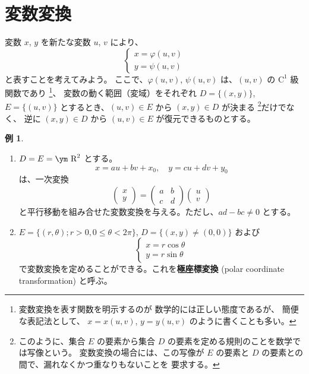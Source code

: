 \documentclass[a4paper]{jsarticle}
\theoremstyle{definition}
\newtheorem{Example}[Theorem]{例}
\theoremstyle{remark}
\newcommand{\R}{\text{\ym R}}
\begin{document}

\section{変数変換}
変数 $x$, $y$ を新たな変数 $u$, $v$ により、
\[
\left\{
\begin{matrix}
x = \varphi(u,v)\\
y = \psi(u,v)
\end{matrix}
\right.
\]
と表すことを考えてみよう。
ここで、$\varphi(u,v)$, $\psi(u,v)$ は、$(u,v)$ の $\text{C}^1$ 級関数であり
\footnote{変数変換を表す関数を明示するのが 数学的には正しい態度であるが、
簡便な表記法として、
$x=x(u,v)$, $y = y(u,v)$ のように書くことも多い。}、
変数の動く範囲（変域）をそれぞれ $D = \{(x,y)\}$, 
$E = \{ (u,v)\}$ とするとき、$(u,v) \in E$ から $(x,y) \in D$ が決まる
\footnote{
このように、集合 $E$ の要素から集合 $D$ の要素を定める規則のことを数学では写像という。
変数変換の場合には、この写像が $E$ の要素と $D$ の要素との間で、漏れなくかつ重なりもないことを
要求する。
}だけでなく、
逆に $(x,y) \in D$ から $(u,v) \in E$ が復元できるものとする。

\begin{Example}~ 
\begin{enumerate}
\item
$D=E = \R^2$ とする。
\[
x = au + bv + x_0, 
\quad 
y = cu + dv + y_0
\]
は、一次変換
\[
\begin{pmatrix}
x\\
y
\end{pmatrix}
= 
\begin{pmatrix}
a & b\\
c & d  
\end{pmatrix}
\begin{pmatrix}
u\\
v
\end{pmatrix}
\]
と平行移動を組み合せた変数変換を与える。ただし、$ad - bc \not= 0$ とする。
\item 
$E = \{ (r,\theta); r>0, 0\leq \theta < 2\pi \}$, 
$D = \{ (x,y) \not= (0,0) \}$ および
\[
\left\{
\begin{matrix}
x = r\cos\theta\\
y = r\sin\theta
\end{matrix}
\right.
\]
で変数変換を定めることができる。これを{\bf 極座標変換}
 (polar coordinate transformation) と呼ぶ。
\end{enumerate}
\end{Example}
\end{document}
